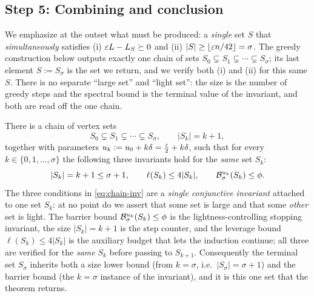 \subsection*{Step 5: Combining and conclusion}

We emphasize at the outset what must be produced: a \emph{single} set $S$ that
\emph{simultaneously} satisfies (i) $\varepsilon L-L_S\succeq0$ and
(ii) $|S|\ge\lfloor\varepsilon n/42\rfloor=\sigma$. The greedy construction below
outputs exactly one chain of sets $S_0\subsetneq S_1\subsetneq\cdots\subsetneq
S_\sigma$; its last element $S:=S_\sigma$ is the set we return, and we verify both
(i) and (ii) for this same $S$. There is no separate ``large set'' and ``light
set'': the size is the number of greedy steps and the spectral bound is the
terminal value of the invariant, and both are read off the one chain.

\begin{qsixproposition}\label{prop:chain}
There is a chain of vertex sets
\[
  S_0\subsetneq S_1\subsetneq\cdots\subsetneq S_\sigma,
  \qquad |S_k|=k+1,
\]
together with parameters $u_k:=u_0+k\delta=\tfrac{\varepsilon}{2}+k\delta$, such that for
every $k\in\{0,1,\dots,\sigma\}$ the following three invariants hold for the
\emph{same} set $S_k$:
\begin{equation}\label{eq:chain-inv}
  |S_k|=k+1\le\sigma+1,\qquad
  \ell(S_k)\le 4|S_k|,\qquad
  \mathcal{B}^{u_k}_{\sigma}(S_k)\le\phi .
\end{equation}
The three conditions in \eqref{eq:chain-inv} are a \emph{single conjunctive
invariant} attached to one set $S_k$: at no point do we assert that some set is
large and that some \emph{other} set is light. The barrier bound
$\mathcal{B}^{u_k}_{\sigma}(S_k)\le\phi$ is the lightness-controlling stopping
invariant, the size $|S_k|=k+1$ is the step counter, and the leverage bound
$\ell(S_k)\le4|S_k|$ is the auxiliary budget that lets the induction continue;
all three are verified for the \emph{same} $S_k$ before passing to $S_{k+1}$.
Consequently the terminal set $S_\sigma$ inherits both a size lower bound (from
$k=\sigma$, i.e.\ $|S_\sigma|=\sigma+1$) and the barrier bound (the $k=\sigma$
instance of the invariant), and it is this one set that the theorem returns.
\end{qsixproposition}

